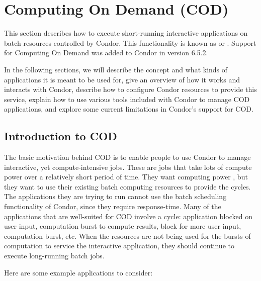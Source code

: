 \section{\label{sec:cod}Computing On Demand (COD)}

This section describes how to execute short-running interactive
applications on batch resources controlled by Condor.
This functionality is known as  or
.
Support for Computing On Demand was added to Condor in version 6.5.2.   

In the following sections, we will describe the concept and what kinds
of applications it is meant to be used for, give an overview of how it
works and interacts with Condor, describe how to configure Condor
resources to provide this service, explain how to use various tools
included with Condor to manage COD applications, and explore some
current limitations in Condor's support for COD.

\subsection{\label{sec:cod-intro}
Introduction to COD}

The basic motivation behind COD is to enable people to use Condor to
manage interactive, yet compute-intensive jobs.
These are jobs that take lots of compute power over a relatively short
period of time.
They want computing power , but they want to use their
existing batch computing resources to provide the cycles.
The applications they are trying to run cannot use the batch
scheduling functionality of Condor, since they require
 response-time.
Many of the applications that are well-suited for COD involve a cycle:
application blocked on user input, computation burst to compute
results, block for more user input, computation burst, etc.
When the resources are not being used for the bursts of computation to
service the interactive application, they should continue to execute
long-running batch jobs.

Here are some example applications to consider:

